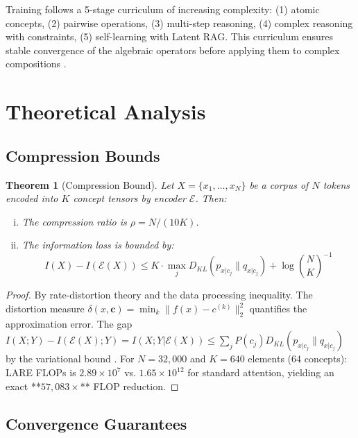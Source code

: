 \documentclass{article}
\newtheorem{theorem}{Theorem}
\newcommand{\bc}{\mathbf{c}}
\begin{document}
Training follows a 5-stage curriculum of increasing complexity: (1) atomic concepts, (2) pairwise operations, (3) multi-step reasoning, (4) complex reasoning with constraints, (5) self-learning with Latent RAG. This curriculum ensures stable convergence of the algebraic operators before applying them to complex compositions \citep{bengio2009curriculum}.

\section{Theoretical Analysis}

\subsection{Compression Bounds}

\begin{theorem}[Compression Bound]\label{thm:compression}
Let $X = \{x_1, \ldots, x_N\}$ be a corpus of $N$ tokens encoded into $K$ concept tensors by encoder $\mathcal{E}$. Then:
\begin{enumerate}[(i)]
    \item The compression ratio is $\rho = N / (10K)$.
    \item The information loss is bounded by:
    \begin{equation}
    I(X) - I(\mathcal{E}(X)) \leq K \cdot \max_j D_{KL}(p_{x|c_j} \| q_{x|c_j}) + \log \binom{N}{K}^{-1}
    \end{equation}
\end{enumerate}
\end{theorem}

\begin{proof}
By rate-distortion theory \citep{cover2006elements} and the data processing inequality. The distortion measure $\delta(x, \bc) = \min_k \|f(x) - c^{(k)}\|_2^2$ quantifies the approximation error. The gap $I(X;Y) - I(\mathcal{E}(X);Y) = I(X;Y|\mathcal{E}(X)) \leq \sum_j P(c_j) D_{KL}(p_{x|c_j} \| q_{x|c_j})$ by the variational bound \citep{barber2003im}. For $N=32{,}000$ and $K=640$ elements (64 concepts): LARE FLOPs is $2.89 \times 10^7$ vs. $1.65 \times 10^{12}$ for standard attention, yielding an exact **$57{,}083\times$** FLOP reduction.
\end{proof}

\subsection{Convergence Guarantees}
\end{document}
